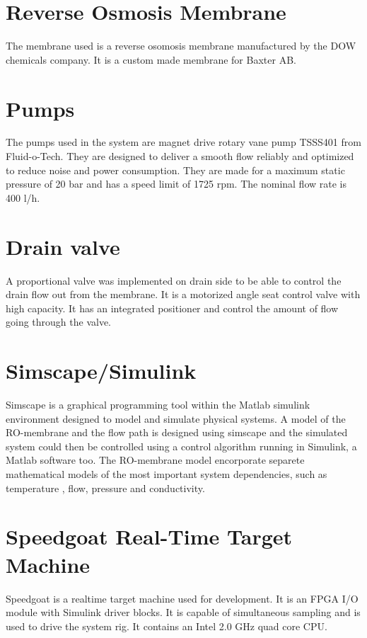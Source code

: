 
\section{Reverse Osmosis Membrane}
The membrane used is a reverse osomosis membrane manufactured by the DOW chemicals company. It is a custom made membrane for Baxter AB. 

\section{Pumps}
The pumps used in the system are magnet drive rotary vane pump TSSS401 from Fluid-o-Tech. They are designed to deliver a smooth flow reliably and optimized to reduce noise and power consumption. They are made for a maximum static pressure of 20 bar and has a speed limit of 1725 rpm. The nominal flow rate is 400 l/h. 

\section{Drain valve}
A proportional valve was implemented on drain side to be able to control the drain flow out from the membrane. It is a motorized angle seat control valve with high capacity. It has an integrated positioner and control the amount of flow going through the valve.

\section{Simscape/Simulink} 
\label{Simscape}

Simscape is a graphical programming tool within the Matlab simulink environment designed to model and simulate physical systems. A model of the RO-membrane and the flow path is designed using simscape and the simulated system could then be controlled using a control algorithm running in Simulink, a Matlab software too. The RO-membrane model encorporate separete mathematical models of the most important system dependencies, such as temperature , flow, pressure and conductivity.  


\section{Speedgoat Real-Time Target Machine}
\label{speedgoat}
Speedgoat is a realtime target machine used for development. It is an FPGA I/O module with Simulink driver blocks. It is capable of simultaneous sampling and is used to drive the system rig. It contains an Intel 2.0 GHz quad core CPU. 

